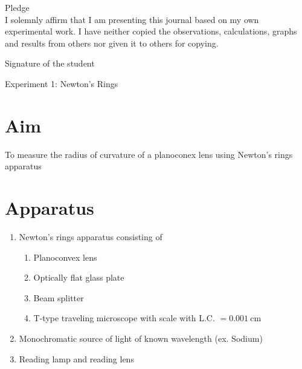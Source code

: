 \documentclass[11pt]{article}
\begin{document}
	\begin{center}
	{\Large Pledge}\\
	\vspace{0.5cm}
	I solemnly affirm that I am presenting this journal based on my own experimental work. I have neither copied the observations, calculations, graphs and results from others nor given it to others for copying.\\
		\end{center}
	
	\vspace{0.5cm}
	
    \begin{flushright}
	{\large Signature of the student}\\
	\vspace{1cm}
	 \end{flushright}
	
	
	
	\begin{center}
		{\LARGE Experiment 1: Newton's Rings}\\
	\end{center}

	\section{Aim}
	\noindent
	To measure the radius of curvature of a planoconex lens using Newton's rings apparatus\\
	
	\section{Apparatus}

	\begin{enumerate}
		\item Newton's rings apparatus consisting of
		
		\begin{enumerate}
			\item Planoconvex lens
			\item Optically flat glass plate
			\item Beam splitter
			\item T-type traveling microscope with scale with L.C. $=0.001 \mathrm{~cm}$
		\end{enumerate}
		\item Monochromatic source of light of known wavelength (ex. Sodium)
		\item Reading lamp and reading lens
	\end{enumerate}
\end{document}
